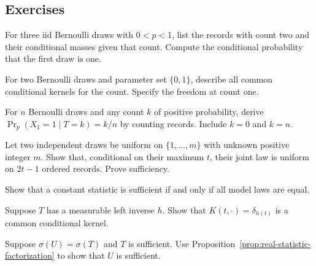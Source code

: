 \documentclass[11pt,oneside]{book}
\theoremstyle{definition}
\theoremstyle{remark}
\begin{document}
\subsection{Exercises}
\label{subsec:practice-4-2}

\begin{practiceexercise}
\label{pex:sufficiency-bernoulli-three-fiber}
For three iid Bernoulli draws with $0<p<1$, list the records
with count two and their conditional masses given that count.
Compute the conditional probability that the first draw is one.
\end{practiceexercise}

\begin{practiceexercise}
\label{pex:sufficiency-bernoulli-null-fibers}
For two Bernoulli draws and parameter set $\{0,1\}$, describe
all common conditional kernels for the count. Specify the
freedom at count one.
\end{practiceexercise}

\begin{practiceexercise}
\label{pex:sufficiency-bernoulli-one-coordinate}
For $n$ Bernoulli draws and any count $k$ of positive probability,
derive $\Pr_p(X_1=1\mid T=k)=k/n$ by counting records.
Include $k=0$ and $k=n$.
\end{practiceexercise}

\begin{practiceexercise}
\label{pex:sufficiency-discrete-uniform-maximum}
Let two independent draws be uniform on $\{1,\ldots,m\}$
with unknown positive integer $m$. Show that, conditional
on their maximum $t$, their joint law is uniform on
$2t-1$ ordered records. Prove sufficiency.
\end{practiceexercise}

\begin{practiceexercise}
\label{pex:sufficiency-constant-statistic}
Show that a constant statistic is sufficient if and only
if all model laws are equal.
\end{practiceexercise}

\begin{practiceexercise}
\label{pex:sufficiency-invertible-statistic}
Suppose $T$ has a measurable left inverse $h$. Show that
$K(t,\cdot)=\delta_{h(t)}$ is a common conditional kernel.
\end{practiceexercise}

\begin{practiceexercise}
\label{pex:sufficiency-same-sigma-algebra}
Suppose $\sigma(U)=\sigma(T)$ and $T$ is sufficient.
Use Proposition~\ref{prop:real-statistic-factorization}
to show that $U$ is sufficient.
\end{practiceexercise}
\end{document}
